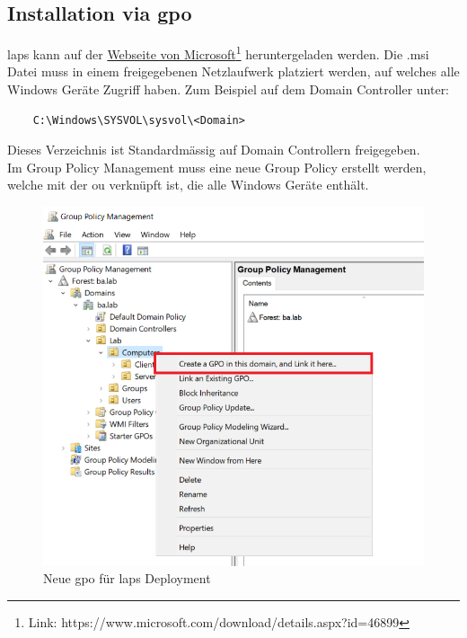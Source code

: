 \subsection{Installation via \acrshort{gpo}}
\acrshort{laps} kann auf der \href{https://www.microsoft.com/download/details.aspx?id=46899}{Webseite von Microsoft}\footnote{Link: https://www.microsoft.com/download/details.aspx?id=46899} heruntergeladen werden.
Die .msi Datei muss in einem freigegebenen Netzlaufwerk platziert werden, auf welches alle Windows Geräte Zugriff haben.
Zum Beispiel auf dem Domain Controller unter:
\begin{lstlisting}
    C:\Windows\SYSVOL\sysvol\<Domain>
\end{lstlisting}
Dieses Verzeichnis ist Standardmässig auf Domain Controllern freigegeben.\\

Im Group Policy Management muss eine neue Group Policy erstellt werden, welche mit der \acrshort{ou} verknüpft ist, die alle Windows Geräte enthält.
\begin{figure}[H]
    \centering
    \includegraphics[width=0.7\linewidth]{../img/LAPS/GPO-Create-New.png}
    \caption{Neue \acrshort{gpo} für \acrshort{laps} Deployment}
\end{figure}

